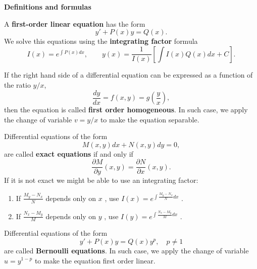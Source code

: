 \documentclass[11pt]{article}
\begin{document}
\begin{preamble}
\textbf{Definitions and formulas}

\begin{formulaitem}
\item A \textbf{first-order linear equation} has the form
\[y' +P(x)y=Q(x).\]
We solve this equations using the \textbf{integrating factor} formula
\[I(x)=e^{\int P(x) dx},\qquad y(x)=\frac{1}{I(x)}\left[\int I(x)Q(x)dx +C \right].\]

\item If the right hand side of a differential equation can be expressed as a function of the ratio $y/x$, \[\frac{dy}{dx}=f(x,y)=g\left(\frac{y}{x}\right),\] then the equation is called \textbf{first order homogeneous}. In such case, we apply the change of variable $v=y/x$ to make the equation separable.

\item Differential equations of the form
\[M(x,y)dx + N(x,y) dy = 0,\]
are called \textbf{exact equations} if and only if
\[\frac{\partial M}{\partial y}(x,y)=\frac{\partial N}{\partial x}(x,y).\]
If it is not exact we might be able to use an integrating factor:
\begin{enumerate}
 \item If $\frac{M_{ y} - N_{ x}}{ N}$ depends only on $x$ , use $I ( x ) = e^{\int \frac{M_{ y} - N_{ x}}{ N} dx}$ .
 \item If $\frac{N_{ x} - M_{ y}}{ M}$ depends only on $y$ , use $I ( y ) = e^{\int \frac{N_{ x} - M_{ y}}{ M} dx}$ .
\end{enumerate}


\item Differential equations of the form
\[y'+P(x)y=Q(x)y^{p},\quad p\neq 1\]
are called \textbf{Bernoulli equations}. In such case, we apply the change of variable $u=y^{1-p}$ to make the equation first order linear.
\end{formulaitem}
\end{preamble}
\end{document}
